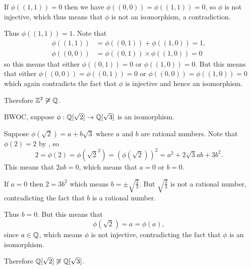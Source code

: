 \begin{questions}
    If $\phi((1,1)) = 0$ then we have $\phi((0,0)) = \phi((1,1)) = 0$, so $\phi$ is not injective, which thus means that $\phi$ is not an isomorphism, a contradiction.

    Thus $\phi((1,1)) = 1$. Note that
    \begin{align*}
        \phi((1,1)) &= \phi((0,1)) + \phi((1,0)) = 1,\\
        \phi((0,0)) &= \phi((0,1)) \times \phi((1,0)) = 0
    \end{align*}
    so this means that either $\phi((0,1)) = 0$ or $\phi((1,0)) = 0$. But this means that either $\phi((0,0)) = \phi((0,1)) = 0$ or $\phi((0,0)) = \phi((1,0)) = 0$ which again contradicts the fact that $\phi$ is injective and hence an isomorphism.

    Therefore $\mathbb{Z}^2 \not\cong \mathbb{Q}$.

    \item BWOC, suppose $\phi: \mathbb{Q}[\sqrt2] \to \mathbb{Q}[\sqrt3]$ is an isomorphism.
    
    Suppose $\phi(\sqrt2) = a + b\sqrt3$ where $a$ and $b$ are rational numbers. Note that $\phi(2) = 2$ by , so
    \[
        2 = \phi(2) = \phi({\sqrt2}^2) = \left(\phi(\sqrt2)\right)^2 = a^2 + 2\sqrt3ab + 3b^2.
    \]
    This means that $2ab = 0$, which means that $a = 0$ or $b = 0$.

    If $a = 0$ then $2 = 3b^2$ which means $b = \pm\sqrt{\frac23}$. But $\sqrt{\frac23}$ is not a rational number, contradicting the fact that $b$ is a rational number.

    Thus $b = 0$. But this means that
    \[
        \phi(\sqrt2) = a = \phi(a),
    \]
    since $a \in \mathbb{Q}$, which means $\phi$ is not injective, contradicting the fact that $\phi$ is an isomorphism.

    Therefore $\mathbb{Q}[\sqrt2] \not\cong \mathbb{Q}[\sqrt3]$.


\end{questions}
